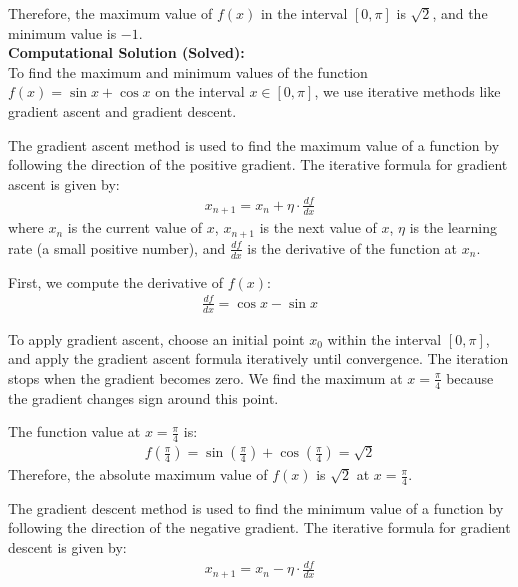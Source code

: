 \documentclass[journal]{IEEEtran}
\begin{document}
\begin{enumerate}
Therefore, the maximum value of $f(x)$ in the interval $[0, \pi]$ is $\sqrt{2}$, and the minimum value is $-1$.\\

\textbf{Computational Solution (Solved):}\\

To find the maximum and minimum values of the function $f(x) = \sin x + \cos x$ on the interval $x \in [0, \pi]$, we use iterative methods like gradient ascent and gradient descent.

\vspace{2mm}

The gradient ascent method is used to find the maximum value of a function by following the direction of the positive gradient. The iterative formula for gradient ascent is given by:
\begin{align}
    x_{n+1} = x_n + \eta \cdot \frac{df}{dx}
\end{align}
where $x_n$ is the current value of $x$, $x_{n+1}$ is the next value of $x$, $\eta$ is the learning rate (a small positive number), and $\frac{df}{dx}$ is the derivative of the function at $x_n$.

First, we compute the derivative of $f(x)$:
\begin{align}
    \frac{df}{dx} = \cos x - \sin x
\end{align}

To apply gradient ascent, choose an initial point $x_0$ within the interval $[0, \pi]$, and apply the gradient ascent formula iteratively until convergence. The iteration stops when the gradient becomes zero. We find the maximum at $x = \frac{\pi}{4}$ because the gradient changes sign around this point.

The function value at $x = \frac{\pi}{4}$ is:
\begin{align}
    f\left(\frac{\pi}{4}\right) = \sin\left(\frac{\pi}{4}\right) + \cos\left(\frac{\pi}{4}\right) = \sqrt{2}
\end{align}
Therefore, the absolute maximum value of $f(x)$ is $\sqrt{2}$ at $x = \frac{\pi}{4}$.

\vspace{2mm}

The gradient descent method is used to find the minimum value of a function by following the direction of the negative gradient. The iterative formula for gradient descent is given by:
\begin{align}
    x_{n+1} = x_n - \eta \cdot \frac{df}{dx}
\end{align}


\end{enumerate}
\end{document}
